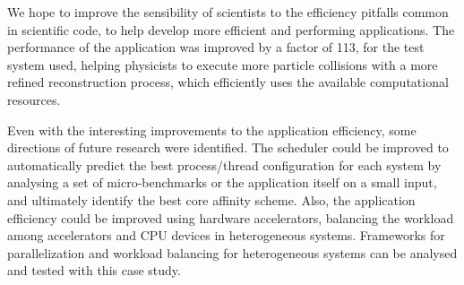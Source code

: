 We hope to improve the sensibility of scientists to the efficiency pitfalls common in scientific code, to help develop more efficient and performing applications. The performance of the \tth application was improved by a factor of 113, for the test system used, helping physicists to execute more particle collisions with a more refined reconstruction process, which efficiently uses the available computational resources.

Even with the interesting improvements to the application efficiency, some directions of future research were identified. The scheduler could be improved to automatically predict the best process/thread configuration for each system by analysing a set of micro-benchmarks or the application itself on a small input, and ultimately identify the best core affinity scheme. Also, the application efficiency could be improved using hardware accelerators, balancing the workload among accelerators and CPU devices in heterogeneous systems. Frameworks for parallelization and workload balancing for heterogeneous systems can be analysed and tested with this case study.

